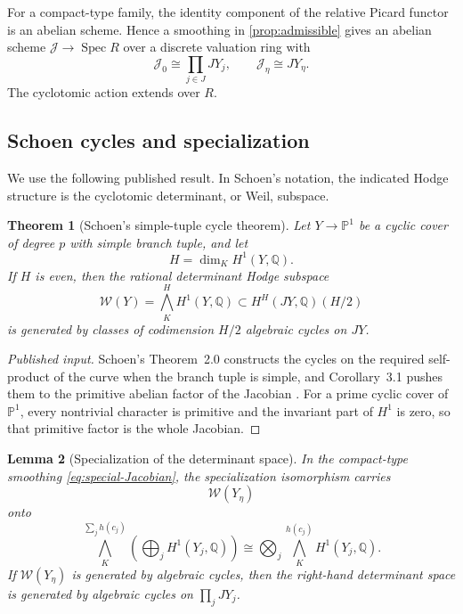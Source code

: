 \documentclass[11pt]{article}
\newtheorem{theorem}{Theorem}[section]
\newtheorem{lemma}[theorem]{Lemma}
\theoremstyle{definition}
\theoremstyle{remark}
\newcommand{\Q}{\mathbb Q}
\newcommand{\PP}{\mathbb P}
\begin{document}
For a compact-type family, the identity component of the relative Picard functor is an abelian scheme.  Hence a smoothing in \cref{prop:admissible} gives an abelian scheme $\mathcal J\to\operatorname{Spec}R$ over a discrete valuation ring with
\begin{equation}\label{eq:special-Jacobian}
 \mathcal J_0\cong\prod_{j\in J}JY_j,
 \qquad
 \mathcal J_\eta\cong JY_\eta.
\end{equation}
The cyclotomic action extends over $R$.

\subsection{Schoen cycles and specialization}

We use the following published result.  In Schoen's notation, the indicated Hodge structure is the cyclotomic determinant, or Weil, subspace.

\begin{theorem}[Schoen's simple-tuple cycle theorem]\label{thm:Schoen}
Let $Y\to\PP^1$ be a cyclic cover of degree $p$ with simple branch tuple, and let
\[
 H=\dim_KH^1(Y,\Q).
\]
If $H$ is even, then the rational determinant Hodge subspace
\[
 \mathcal W(Y)=\bigwedge_K^H H^1(Y,\Q)
 \subset H^H(JY,\Q)(H/2)
\]
is generated by classes of codimension $H/2$ algebraic cycles on $JY$.
\end{theorem}

\begin{proof}[Published input]
Schoen's Theorem~2.0 constructs the cycles on the required self-product of the curve when the branch tuple is simple, and Corollary~3.1 pushes them to the primitive abelian factor of the Jacobian \cite{Schoen}.  For a prime cyclic cover of $\PP^1$, every nontrivial character is primitive and the invariant part of $H^1$ is zero, so that primitive factor is the whole Jacobian.
\end{proof}

\begin{lemma}[Specialization of the determinant space]\label{lem:specialization}
In the compact-type smoothing \eqref{eq:special-Jacobian}, the specialization isomorphism carries
\[
 \mathcal W(Y_\eta)
\]
onto
\begin{equation}\label{eq:det-direct-sum}
 \bigwedge_K^{\sum_jh(c_j)}
 \left(\bigoplus_jH^1(Y_j,\Q)\right)
 \cong
 \bigotimes_j\bigwedge_K^{h(c_j)}H^1(Y_j,\Q).
\end{equation}
If $\mathcal W(Y_\eta)$ is generated by algebraic cycles, then the right-hand determinant space is generated by algebraic cycles on $\prod_jJY_j$.
\end{lemma}
\end{document}
